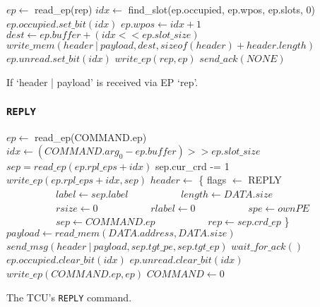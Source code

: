 \documentclass[a4paper,11pt,draft]{article}
\begin{document}
\begin{algorithm}[H]
    $ep \gets$ read\_ep(rep)\;
    \BlankLine
    $idx \gets$ find\_slot(ep.occupied, ep.wpos, ep.slots, 0)\;
    $ep.occupied.set\_bit(idx)$\;
    $ep.wpos \gets idx + 1$\;
    \BlankLine
    $dest \gets ep.buffer + (idx << ep.slot\_size)$\;
    $write\_mem(header\ |\ payload, dest, sizeof(header) + header.length)$\;
    $ep.unread.set\_bit(idx)$\;
    $write\_ep(rep, ep)$\;
    \BlankLine
    \BlankLine
    $send\_ack(NONE)$\;
    \caption{If `header | payload' is received via EP `rep'.}
\end{algorithm}

\subsubsection{\texttt{REPLY}}

\begin{algorithm}[H]
    $ep \gets$ read\_ep(COMMAND.ep)\;
    \BlankLine
    $idx \gets (COMMAND.arg_0 - ep.buffer) >> ep.slot\_size$\;
    $sep = read\_ep(ep.rpl\_eps + idx)$\;
    \BlankLine
    sep.cur\_crd -= 1\;
    $write\_ep(ep.rpl\_eps + idx, sep)$\;
    \BlankLine
    $header \gets$ \{ flags $\gets$ REPLY\;
    $\quad\quad\quad\quad\quad label \gets sep.label$\;
    $\quad\quad\quad\quad\quad length \gets DATA.size$\;
    $\quad\quad\quad\quad\quad rsize \gets 0$\;
    $\quad\quad\quad\quad\quad rlabel \gets 0$\;
    $\quad\quad\quad\quad\quad spe \gets ownPE$\;
    $\quad\quad\quad\quad\quad sep \gets COMMAND.ep$\;
    $\quad\quad\quad\quad\quad rep \gets sep.crd\_ep$ \}\;
    $payload \gets read\_mem(DATA.address, DATA.size)$\;
    $send\_msg(header\ |\ payload, sep.tgt\_pe, sep.tgt\_ep)$\;
    $wait\_for\_ack()$\;
    \BlankLine
    $ep.occupied.clear\_bit(idx)$\;
    $ep.unread.clear\_bit(idx)$\;
    $write\_ep(COMMAND.ep, ep)$\;
    \BlankLine
    $COMMAND \gets 0$\;
    \caption{The TCU's \texttt{REPLY} command.}
\end{algorithm}
\end{document}
